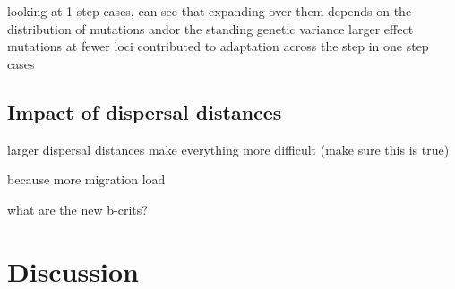 	looking at 1 step cases, can see that expanding over them depends on the distribution of mutations and\/or the standing genetic variance
	larger effect mutations at fewer loci contributed to adaptation across the step in one step cases
	
\subsection{Impact of dispersal distances}

larger dispersal distances make everything more difficult (make sure this is true)

because more migration load

what are the new b-crits?


\section{Discussion}





